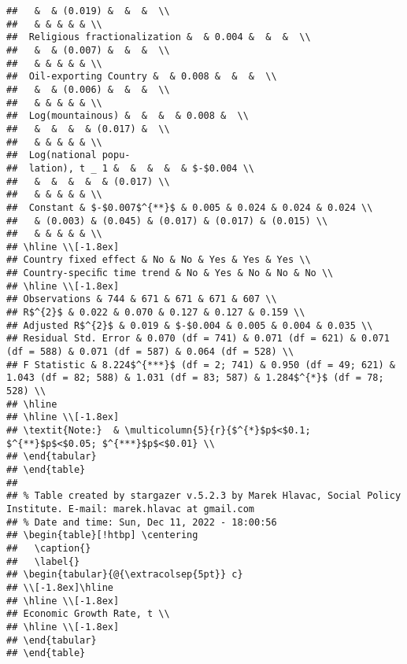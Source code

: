 \documentclass[
]{article}
\begin{document}
\begin{verbatim}
##   &  & (0.019) &  &  &  \\ 
##   & & & & & \\ 
##  Religious fractionalization &  & 0.004 &  &  &  \\ 
##   &  & (0.007) &  &  &  \\ 
##   & & & & & \\ 
##  Oil-exporting Country &  & 0.008 &  &  &  \\ 
##   &  & (0.006) &  &  &  \\ 
##   & & & & & \\ 
##  Log(mountainous) &  &  &  & 0.008 &  \\ 
##   &  &  &  & (0.017) &  \\ 
##   & & & & & \\ 
##  Log(national popu-
##  lation), t _ 1 &  &  &  &  & $-$0.004 \\ 
##   &  &  &  &  & (0.017) \\ 
##   & & & & & \\ 
##  Constant & $-$0.007$^{**}$ & 0.005 & 0.024 & 0.024 & 0.024 \\ 
##   & (0.003) & (0.045) & (0.017) & (0.017) & (0.015) \\ 
##   & & & & & \\ 
## \hline \\[-1.8ex] 
## Country fixed effect & No & No & Yes & Yes & Yes \\ 
## Country-speciﬁc time trend & No & Yes & No & No & No \\ 
## \hline \\[-1.8ex] 
## Observations & 744 & 671 & 671 & 671 & 607 \\ 
## R$^{2}$ & 0.022 & 0.070 & 0.127 & 0.127 & 0.159 \\ 
## Adjusted R$^{2}$ & 0.019 & $-$0.004 & 0.005 & 0.004 & 0.035 \\ 
## Residual Std. Error & 0.070 (df = 741) & 0.071 (df = 621) & 0.071 (df = 588) & 0.071 (df = 587) & 0.064 (df = 528) \\ 
## F Statistic & 8.224$^{***}$ (df = 2; 741) & 0.950 (df = 49; 621) & 1.043 (df = 82; 588) & 1.031 (df = 83; 587) & 1.284$^{*}$ (df = 78; 528) \\ 
## \hline 
## \hline \\[-1.8ex] 
## \textit{Note:}  & \multicolumn{5}{r}{$^{*}$p$<$0.1; $^{**}$p$<$0.05; $^{***}$p$<$0.01} \\ 
## \end{tabular} 
## \end{table} 
## 
## % Table created by stargazer v.5.2.3 by Marek Hlavac, Social Policy Institute. E-mail: marek.hlavac at gmail.com
## % Date and time: Sun, Dec 11, 2022 - 18:00:56
## \begin{table}[!htbp] \centering 
##   \caption{} 
##   \label{} 
## \begin{tabular}{@{\extracolsep{5pt}} c} 
## \\[-1.8ex]\hline 
## \hline \\[-1.8ex] 
## Economic Growth Rate, t \\ 
## \hline \\[-1.8ex] 
## \end{tabular} 
## \end{table}
\end{verbatim}
\end{document}
